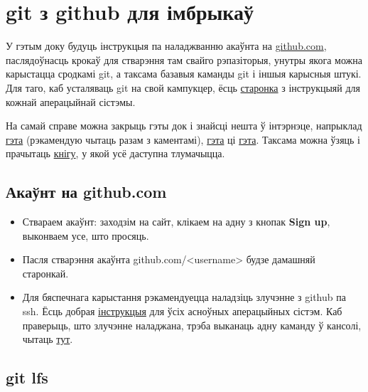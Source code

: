 \documentclass[12pt, a4paper]{extarticle}
\begin{document}
\section{git з github для імбрыкаў}

У гэтым доку будуць інструкцыя па наладжванню акаўнта на \href{https://github.com/}{github.com}, паслядоўнасць крокаў для стварэння там свайго рэпазіторыя, унутры якога можна карыстацца сродкамі git, а таксама базавыя каманды git і іншыя карысныя штукі. Для таго, каб усталяваць git на свой кампукцер, ёсць \href{https://git-scm.com/book/en/v2/Getting-Started-Installing-Git}{старонка} з інструкцыяй для кожнай аперацыйнай сістэмы.

На самай справе можна закрыць гэты док і знайсці нешта ў інтэрнэце, напрыклад \href{https://habr.com/ru/post/125799/}{гэта} (рэкамендую чытаць разам з каментамі), \href{https://www.tutorialspoint.com/git/index.htm}{гэта} ці \href{https://githowto.com}{гэта}. Таксама можна ўзяць і прачытаць \href{https://git-scm.com/book/en/v1/}{кнігу}, у якой усё даступна тлумачыцца.

\subsection{Акаўнт на github.com}

\begin{itemize}

\item Ствараем акаўнт: заходзім на сайт, клікаем на адну з кнопак \textbf{Sign up}, выконваем усе, што просяць.

\item Пасля стварэння акаўнта github.com/<username> будзе дамашняй старонкай.

\item Для бяспечнага карыстання рэкамендуецца наладзіць злучэнне з github па ssh. Ёсць добрая \href{https://help.github.com/en/articles/generating-a-new-ssh-key-and-adding-it-to-the-ssh-agent}{інструкцыя} для ўсіх асноўных аперацыйных сістэм. Каб праверыць, што злучэнне наладжана, трэба выканаць адну каманду ў кансолі, чытаць \href{https://help.github.com/en/articles/testing-your-ssh-connection}{тут}.

\end{itemize}

\subsection{git lfs}
\end{document}
